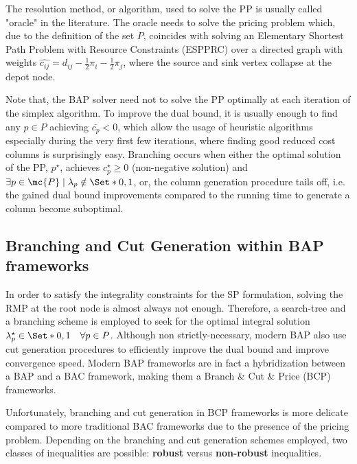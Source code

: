 The resolution method, or algorithm, used to solve the PP is usually called "oracle" in the literature.
The oracle needs to solve the pricing problem which, due to the definition of the set $P$, coincides with solving an Elementary Shortest Path Problem with Resource Constraints (ESPPRC) over a directed graph with weights $\hat{c_{ij}} = d_{ij} - \frac{1}{2} \pi_i - \frac{1}{2} \pi_j$, where the source and sink vertex collapse at the depot node.

Note that, the BAP solver need not to solve the PP optimally at each iteration of the simplex algorithm.
To improve the dual bound, it is usually enough to find any $p \in P$ achieving $\bar{c_p} < 0$, which allow the usage of heuristic algorithms especially during the very first few iterations, where finding good reduced cost columns is surprisingly easy.
Branching occurs when either the optimal solution of the PP, $p^\star$, achieves $c^\star_p \ge 0$ (non-negative solution) and $\exists p \in \mc{P} \mid \lambda_p \notin \Set*{0, 1}$, or, the column generation procedure tails off, i.e. the gained dual bound improvements compared to the running time to generate a column become suboptimal.



\subsection{Branching and Cut Generation within BAP frameworks}
\label{sec:intro-branching-and-cut-generation-within-bap-frameworks}

In order to satisfy the integrality constraints for the SP formulation, solving the RMP at the root node
is almost always not enough.
Therefore, a search-tree and a branching scheme is employed to seek for the optimal integral solution $\lambda^\star_p \in \Set*{0, 1} \quad \forall p \in P$.
Although non strictly-necessary, modern BAP also use cut generation procedures to efficiently improve the dual bound and improve convergence speed.
Modern BAP frameworks are in fact a hybridization between a BAP and a BAC framework, making them a Branch \& Cut \& Price (BCP) frameworks.

\medskip

Unfortunately, branching and cut generation in BCP frameworks is more delicate compared to more traditional BAC frameworks due to the presence of the pricing problem.
Depending on the branching and cut generation schemes employed, two classes of inequalities are possible: \textbf{robust} versus \textbf{non-robust} inequalities.

